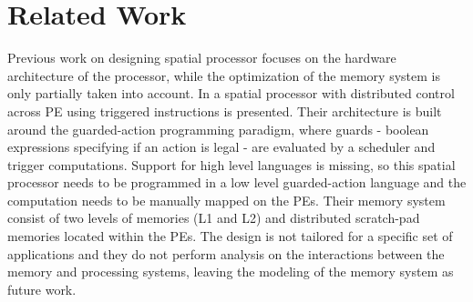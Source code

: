 
\section{Related Work}






Previous work on designing spatial processor focuses on the hardware architecture of the processor, while the optimization of the memory system is only partially taken into account.
In \cite{parashar2014efficient} a spatial processor with distributed control across PE using triggered instructions is presented. Their architecture is built around the guarded-action programming paradigm, where guards - boolean expressions specifying if an action is legal - are evaluated by a scheduler and trigger computations. Support for high level languages is missing, so this spatial processor needs to be programmed in a low level guarded-action language and the computation needs to be manually mapped on the PEs. Their memory system consist of two levels of memories (L1 and L2) and distributed scratch-pad memories located within the PEs. The design is not tailored for a specific set of applications and they do not perform analysis on the interactions between the memory and processing systems, leaving the modeling of the memory system as future work.

